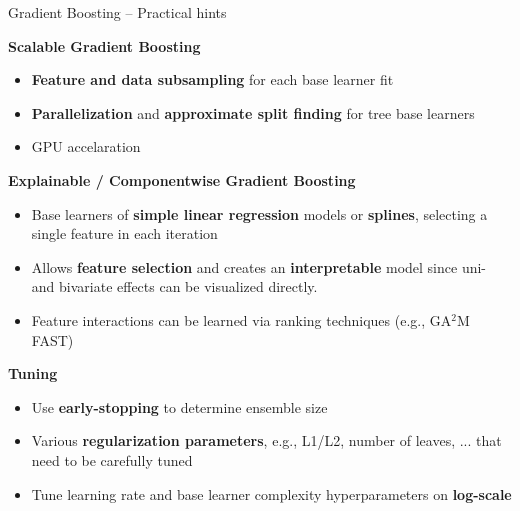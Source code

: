 \documentclass[11pt,compress,t,notes=noshow, xcolor=table]{beamer}
\newcommand{\highlight}[1]{\textcolor{hlcol}{\textbf{#1}}}
\begin{document}
\begin{frame2}{Gradient Boosting -- Practical hints}
  \footnotesize

\highlight{Scalable Gradient Boosting} 

\begin{itemize}
  \item \textbf{Feature and data subsampling} for each base learner fit
  \item \textbf{Parallelization} and \textbf{approximate split finding} for tree base learners
  \item GPU accelaration
\end{itemize}

\medskip

\highlight{Explainable / Componentwise Gradient Boosting}
\begin{itemize}
    \item Base learners of \textbf{simple linear regression} models or \textbf{splines}, selecting a single feature in each iteration
    \item Allows \textbf{feature selection} and creates an \textbf{interpretable} model since uni- and bivariate effects can be visualized directly.
    \item Feature interactions can be learned via ranking techniques (e.g., GA$^2$M FAST)
\end{itemize}

\medskip

\highlight{Tuning}
\begin{itemize}
    \item Use \textbf{early-stopping} to determine ensemble size
    \item Various \textbf{regularization parameters}, e.g., L1/L2, number of leaves, ... that need to be carefully tuned
    \item Tune learning rate and base learner complexity hyperparameters on \textbf{log-scale}
\end{itemize}

\end{frame2}
\end{document}
